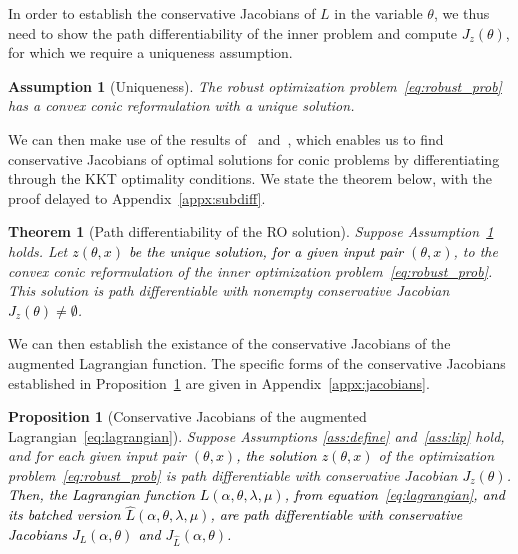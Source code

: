 \documentclass[11pt]{article}
\newtheorem{assumption}{Assumption}
\newtheorem{theorem}{Theorem}[section]
\newtheorem{proposition}{Proposition}[section]
\newtheorem{assumption}{Assumption}[section]
\newcommand{\bsnote}[1]{\noindent\textcolor{red}{\texttt{Bartolomeo: #1}}}
\newcommand{\RC}[1]{\textcolor{black}{#1}}
\begin{document}
In order to establish the conservative Jacobians of $L$ in the variable $\theta$, we thus need to show the path differentiability of the inner problem and compute \RC{$J_{z}(\theta)$}, for which we require a uniqueness assumption.
\begin{assumption} [Uniqueness]
    \label{ass:unique}
    The robust optimization problem~\eqref{eq:robust_prob} has a convex conic reformulation with a unique solution. 
\end{assumption} We can then make use of the results of~\cite{diffcp2019} and~\cite{path-diff}, which enables us to find conservative Jacobians of optimal solutions for conic problems by differentiating through the KKT optimality conditions. 
We state the theorem below, with the proof delayed to Appendix~\ref{appx:subdiff}.
\begin{theorem}[Path differentiability of the \gls{RO} solution] 
\label{thm:subdiff}
	Suppose Assumption~\ref{ass:unique} holds. Let \RC{$z(\theta,x)$ be the unique solution, for a given input pair $(\theta, x)$}, to the convex conic reformulation of the inner optimization problem~\eqref{eq:robust_prob}.
 This solution is path differentiable with nonempty conservative Jacobian  \RC{$J_{z}(\theta) \neq \emptyset$}.
\end{theorem}

We can then establish the existance of the conservative Jacobians of the augmented Lagrangian function. The specific forms of the conservative Jacobians established in Proposition~\ref{prop:jacobians} are given in Appendix~\ref{appx:jacobians}.
\begin{proposition} [Conservative Jacobians of the augmented Lagrangian~\eqref{eq:lagrangian}] 
\label{prop:jacobians}
Suppose Assumptions \ref{ass:define} and~\ref{ass:lip} hold, and for each given input pair \RC{$(\theta, x)$, the solution $z(\theta,x)$} of the optimization problem~\eqref{eq:robust_prob} is path differentiable with conservative Jacobian \RC{$ J_{z}(\theta)$}. \RC{Then, the Lagrangian function $L(\alpha,\theta,\lambda,\mu)$, from equation~\eqref{eq:lagrangian}, and its batched version $\hat{L}(\alpha,\theta,\lambda,\mu)$, are path differentiable with conservative Jacobians $J_L(\alpha,\theta)$ and $J_{\hat{L}}(\alpha,\theta)$.}
\end{proposition}
\end{document}
